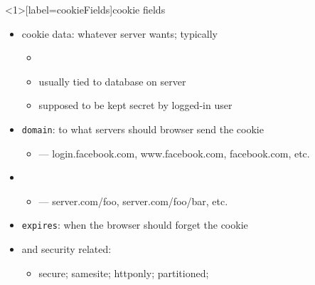 

\begin{frame}<1>[label=cookieFields]{cookie fields}
    \begin{itemize}
        \item cookie data: whatever server wants; typically 
        \begin{itemize}
            \item {}
            \item usually tied to database on server
            \item supposed to be kept secret by logged-in user
        \end{itemize}
    \item \texttt{domain}: to what servers should browser send the cookie
        \begin{itemize}
            \item {} --- login.facebook.com, www.facebook.com, facebook.com, etc.
        \end{itemize}
    \item {}
        \begin{itemize}
            \item {} --- server.com/foo, server.com/foo/bar, etc.
        \end{itemize}
    \item \texttt{expires}: when the browser should forget the cookie
    \item and security related: 
        \begin{itemize}
        \item secure; samesite; httponly; partitioned;
        \end{itemize}
    \end{itemize}
\end{frame}
